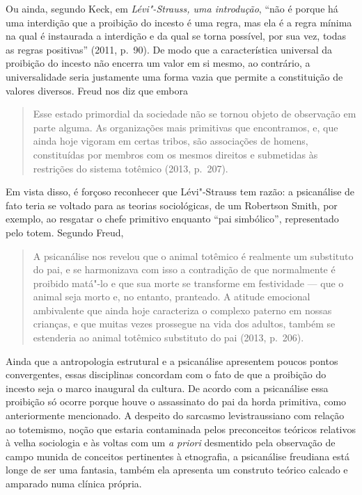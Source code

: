 Ou ainda, segundo Keck, em \emph{Lévi"-Strauss, uma introdução},
``não é porque há uma interdição que a proibição do incesto é uma regra,
mas ela é a regra mínima na qual é instaurada a interdição e da qual se
torna possível, por sua vez, todas as regras positivas'' (2011,
p.~90). De modo que a característica universal da proibição do incesto
não encerra um valor em si mesmo, ao contrário, a universalidade seria
justamente uma forma vazia que permite a constituição de valores
diversos. Freud nos diz que embora

\begin{quote}
Esse estado primordial da sociedade não se tornou objeto de observação
em parte alguma. As organizações mais primitivas que encontramos, e, que
ainda hoje vigoram em certas tribos, são associações de homens,
constituídas por membros com os mesmos direitos e submetidas às
restrições do sistema totêmico (2013, p.~207).
\end{quote}

Em vista disso, é forçoso reconhecer que Lévi"-Strauss tem razão: a
psicanálise de fato teria se voltado para as teorias sociológicas, de um
Robertson Smith, por exemplo, ao resgatar o chefe primitivo enquanto
``pai simbólico'', representado pelo totem. Segundo Freud,

\begin{quote}
A psicanálise nos revelou que o animal totêmico é realmente um
substituto do pai, e se harmonizava com isso a contradição de que
normalmente é proibido matá"-lo e que sua morte se transforme em
festividade --- que o animal seja morto e, no entanto, pranteado. A
atitude emocional ambivalente que ainda hoje caracteriza o complexo
paterno em nossas crianças, e que muitas vezes prossegue na vida dos
adultos, também se estenderia ao animal totêmico substituto do pai
(2013, p.~206).
\end{quote}

Ainda que a antropologia estrutural e a psicanálise apresentem poucos
pontos convergentes, essas disciplinas concordam com o fato de que a
proibição do incesto seja o marco inaugural da cultura. De acordo com a
psicanálise essa proibição só ocorre porque houve o assassinato do pai
da horda primitiva, como anteriormente mencionado. A despeito do
sarcasmo levistraussiano com relação ao totemismo, noção que estaria
contaminada pelos preconceitos teóricos relativos à velha sociologia e
às voltas com um \emph{a priori} desmentido pela observação de campo
munida de conceitos pertinentes à etnografia, a psicanálise freudiana
está longe de ser uma fantasia, também ela apresenta um construto
teórico calcado e amparado numa clínica própria.

